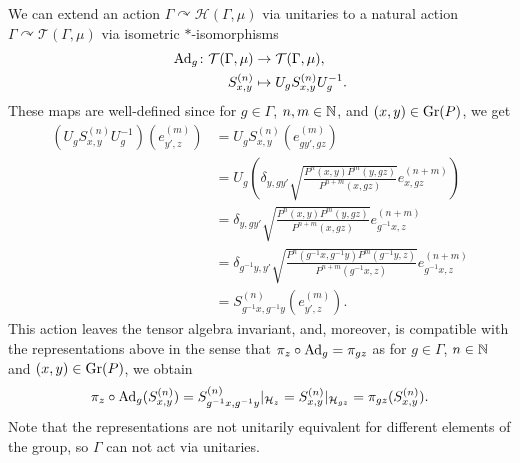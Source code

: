 \documentclass[12pt, class = article, crop = false, a4paper, twoside]{standalone}
\begin{document}
\begin{remark}

    We can extend an action $\Gamma\curvearrowright\mathcal{H}(\Gamma, \mu)$ via unitaries to a natural action $\Gamma\curvearrowright\mathcal{T}(\Gamma, \mu)$ via isometric $\ast$-isomorphisms 
    \begin{equation*}
        \begin{split}
            \operatorname{Ad}_{g}\colon\mathcal{T}(\Gamma, \mu) & \to \mathcal{T}(\Gamma, \mu), \\
            S^{(n)}_{x, y} & \mapsto U_{g}S^{(n)}_{x, y}U^{-1}_{g}.
        \end{split}
    \end{equation*}
    These maps are well-defined since for $g\in\Gamma$, $n, m\in\mathbb{N}$, and $(x, y)\in\operatorname{Gr}(P)$, we get
    \begin{equation*}
        \begin{split}
            (U_{g}S^{(n)}_{x, y}U^{-1}_{g})(e^{(m)}_{y', z}) & = U_{g}S^{(n)}_{x, y}(e^{(m)}_{gy', gz}) \\
            & = U_{g}\left(\delta_{y, gy'}\sqrt{\frac{P^{n}(x, y)P^{m}(y, gz)}{P^{n + m}(x, gz)}}e^{(n + m)}_{x, gz}\right) \\
            & = \delta_{y, gy'}\sqrt{\frac{P^{n}(x, y)P^{m}(y, gz)}{P^{n + m}(x, gz)}}e^{(n + m)}_{g^{-1}x, z} \\
            & = \delta_{g^{-1}y, y'}\sqrt{\frac{P^{n}(g^{-1}x, g^{-1}y)P^{m}(g^{-1}y, z)}{P^{n + m}(g^{-1}x, z)}}e^{(n + m)}_{g^{-1}x, z} \\
            & = S^{(n)}_{g^{-1}x, g^{-1}y}(e^{(m)}_{y', z}).
        \end{split}
    \end{equation*}
    This action leaves the tensor algebra invariant, and, moreover, is compatible with the representations above in the sense that $\pi_{z}\circ\operatorname{Ad}_{g} = \pi_{gz}$
    as for $g\in\Gamma$, $n\in\mathbb{N}$ and $(x, y)\in\operatorname{Gr}(P)$, we obtain
    \begin{equation*}
        \pi_{z}\circ\operatorname{Ad}_{g}(S^{(n)}_{x, y}) = S^{(n)}_{g^{-1}x, g^{-1}y}|_{\mathcal{H}_{z}} = S^{(n)}_{x, y}|_{\mathcal{H}_{gz}} = \pi_{gz}(S^{(n)}_{x, y}).
    \end{equation*}
    Note that the representations are not unitarily equivalent for different elements of the group, so $\Gamma$ can not act via unitaries.
\end{remark}
\end{document}
